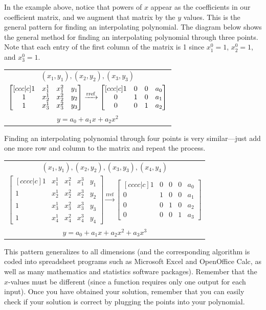 In the example above, notice that powers of $x$ appear as the coefficients in our coefficient matrix, and we augment that matrix by the $y$ values. This is the general pattern for finding an interpolating polynomial. The diagram below shows the general method for finding an interpolating polynomial through three points.  Note that each entry of the first column of the matrix is 1 since $x_1^0=1$, $x_2^0=1$, and $x_3^0=1$.
\begin{center}
\begin{tabular}{c}
$(x_1,y_1),(x_2,y_2),(x_3,y_3)$ \\
 $
\begin{bmatrix}[ccc|c] 
1&x_1^1&x_1^2&y_1\\
1&x_2^1&x_2^2&y_2\\
1&x_3^1&x_3^2&y_3
\end {bmatrix}
\xrightarrow{\operatorname{rref}}
\begin{bmatrix}[ccc|c]
1&0&0&a_0\\
0&1&0&a_1\\
0&0&1&a_2
\end {bmatrix} 
$
\\
 $y=a_0+a_1x+a_2x^2$
\end{tabular}
\end{center}
Finding an interpolating polynomial through four points is very similar---just add one more row and column to the matrix and repeat the process.
\begin{center}
\begin{tabular}{c}
$(x_1,y_1),(x_2,y_2),(x_3,y_3),(x_4,y_4)$\\
$
\begin{bmatrix}[cccc|c] 
1&x_1^1&x_1^2&x_1^3&y_1\\
1&x_2^1&x_2^2&x_2^3&y_2\\
1&x_3^1&x_3^2&x_3^3&y_3\\
1&x_4^1&x_4^2&x_4^3&y_4
\end {bmatrix}
\xrightarrow{\text{rref}}
\begin{bmatrix}[cccc|c]
1&0&0&0&a_0\\
0&1&0&0&a_1\\
0&0&1&0&a_2\\
0&0&0&1&a_3
\end {bmatrix} 
$\\
$y=a_0+a_1x+a_2x^2+a_3x^3$
\end{tabular}
\end{center}
This pattern generalizes to all dimensions (and the corresponding
algorithm is coded into spreadsheet programs such as Microsoft Excel
and OpenOffice Calc, as well as many mathematics and statistics
software packages). Remember that the $x$-values must be different
(since a function requires only one output for each input). Once you have obtained your solution, remember that you can easily check if your solution is correct by plugging the points into your polynomial.



